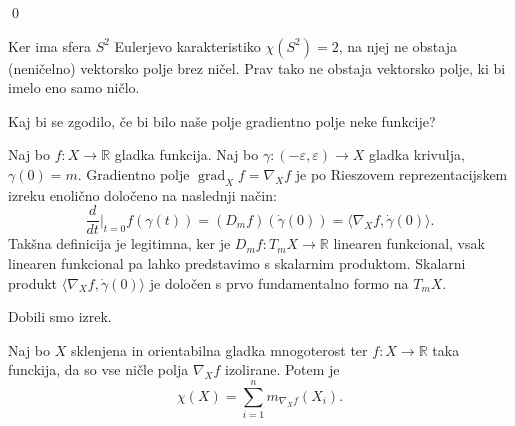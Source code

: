 \qed

\begin{primer}
    Ker ima sfera $S^2$ Eulerjevo karakteristiko $\chi(S^2) = 2$, na njej ne obstaja (neničelno) vektorsko polje brez ničel. Prav tako ne obstaja vektorsko polje, ki bi imelo eno samo ničlo.
    \end{primer}


Kaj bi se zgodilo, če bi bilo naše polje gradientno polje neke funkcije?

\begin{definicija}
\label{def_gradientno_polje}
Naj bo $f: X \to  \mathbb{R}$ gladka funkcija. Naj bo $\gamma: (-\varepsilon, \varepsilon) \to  X$ gladka krivulja, $\gamma(0) = m$. Gradientno polje $\operatorname{grad}_X f = \nabla_X f$ je po Rieszovem reprezentacijskem izreku enolično določeno na naslednji način:
\[ \frac{d}{dt} \bigg|_{t = 0} f(\gamma(t)) = (D_mf)(\dot{\gamma}(0)) = \langle \nabla_X f, \dot{\gamma}(0) \rangle. \]  
Takšna definicija je legitimna, ker je $D_mf: T_mX \to  \mathbb{R}$ linearen funkcional, vsak linearen funkcional pa lahko predstavimo s skalarnim produktom. Skalarni produkt $\langle \nabla_X f, \dot{\gamma}(0) \rangle$ je določen s prvo fundamentalno formo na $T_mX$.
\end{definicija}

Dobili smo izrek.
\begin{izrek}
\label{izr_vsota_nicel_gradientnih_polj}
 Naj bo $X$ sklenjena in orientabilna gladka mnogoterost ter $f: X \to  \mathbb{R}$ taka funckija, da so vse ničle polja $\nabla_X f$ izolirane. Potem je \begin{equation*}
 \chi(X) = \sum_{i = 1}^{n} m_{\nabla_X f} (X_i).
 \end{equation*}  
\end{izrek}

